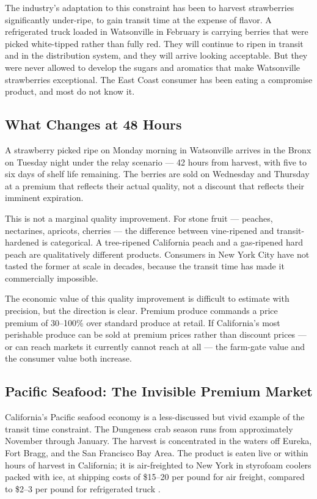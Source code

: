 The industry's adaptation to this constraint has been to harvest strawberries significantly
under-ripe, to gain transit time at the expense of flavor. A refrigerated truck loaded in
Watsonville in February is carrying berries that were picked white-tipped rather than
fully red. They will continue to ripen in transit and in the distribution system, and they
will arrive looking acceptable. But they were never allowed to develop the sugars and
aromatics that make Watsonville strawberries exceptional. The East Coast consumer has
been eating a compromise product, and most do not know it.

\subsection{What Changes at 48 Hours}

A strawberry picked ripe on Monday morning in Watsonville arrives in the Bronx
on Tuesday night under the relay scenario --- 42 hours from harvest, with five to six
days of shelf life remaining. The berries are sold on Wednesday and Thursday at a premium
that reflects their actual quality, not a discount that reflects their imminent expiration.

This is not a marginal quality improvement. For stone fruit --- peaches, nectarines,
apricots, cherries --- the difference between vine-ripened and transit-hardened is
categorical. A tree-ripened California peach and a gas-ripened hard peach are
qualitatively different products. Consumers in New York City have not tasted the former
at scale in decades, because the transit time has made it commercially impossible.

The economic value of this quality improvement is difficult to estimate with precision,
but the direction is clear. Premium produce commands a price premium of 30--100\% over
standard produce at retail. If California's most perishable produce can be sold at
premium prices rather than discount prices --- or can reach markets it currently cannot
reach at all --- the farm-gate value and the consumer value both increase.

\subsection{Pacific Seafood: The Invisible Premium Market}

California's Pacific seafood economy is a less-discussed but vivid example of the
transit time constraint. The Dungeness crab season runs from approximately November
through January. The harvest is concentrated in the waters off Eureka, Fort Bragg,
and the San Francisco Bay Area. The product is eaten live or within hours of harvest
in California; it is air-freighted to New York in styrofoam coolers packed with ice,
at shipping costs of \$15--20 per pound for air freight, compared to \$2--3 per pound
for refrigerated truck \citep{FHWA_freight2023}.

